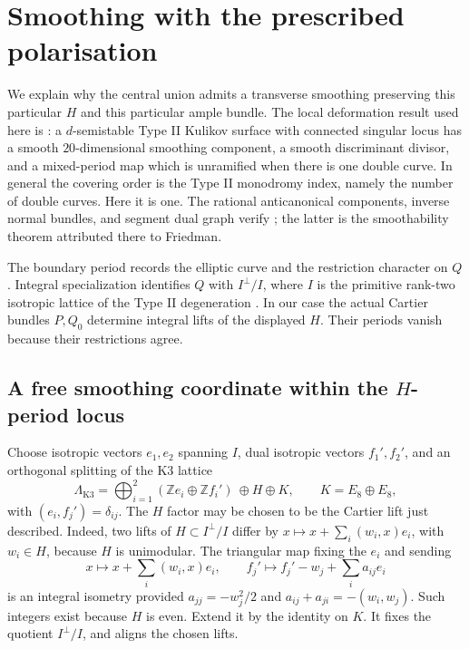 \documentclass[11pt]{article}
\theoremstyle{definition}
\theoremstyle{remark}
\newcommand{\Z}{\mathbb Z}
\begin{document}
\section{Smoothing with the prescribed polarisation}\label{sec:smoothing}

We explain why the central union admits a transverse smoothing preserving this particular $H$ and this particular ample bundle. The local deformation result used here is \cite[\S7A, Theorem~7.1]{AE}: a $d$-semistable Type II Kulikov surface with connected singular locus has a smooth $20$-dimensional smoothing component, a smooth discriminant divisor, and a mixed-period map which is unramified when there is one double curve. In general the covering order is the Type II monodromy index, namely the number of double curves. Here it is one. The rational anticanonical components, inverse normal bundles, and segment dual graph verify \cite[Definition~3.4 and Theorem~3.5]{AE}; the latter is the smoothability theorem attributed there to Friedman.

The boundary period records the elliptic curve and the restriction character on $Q$. Integral specialization identifies $Q$ with $I^\perp/I$, where $I$ is the primitive rank-two isotropic lattice of the Type II degeneration \cite[Proposition~3.20 and \S4]{AE}. In our case the actual Cartier bundles $P,Q_0$ determine integral lifts of the displayed $H$. Their periods vanish because their restrictions agree.

\subsection{A free smoothing coordinate within the \texorpdfstring{$H$}{H}-period locus}
Choose isotropic vectors $e_1,e_2$ spanning $I$, dual isotropic vectors $f_1',f_2'$, and an orthogonal splitting of the K3 lattice
\[
\Lambda_{\mathrm{K3}}=\bigoplus_{i=1}^2(\Z e_i\oplus\Z f_i')\ \oplus H\oplus K,
\qquad K=E_8\oplus E_8,
\]
with $(e_i,f_j')=\delta_{ij}$. The $H$ factor may be chosen to be the Cartier lift just described. Indeed, two lifts of $H\subset I^\perp/I$ differ by
$x\mapsto x+\sum_i(w_i,x)e_i$, with $w_i\in H$, because $H$ is unimodular. The triangular map fixing the $e_i$ and sending
\[
x\longmapsto x+\sum_i(w_i,x)e_i,\qquad
f_j'\longmapsto f_j'-w_j+\sum_i a_{ij}e_i
\]
is an integral isometry provided
$a_{jj}=-w_j^2/2$ and $a_{ij}+a_{ji}=-(w_i,w_j)$. Such integers exist because $H$ is even. Extend it by the identity on $K$. It fixes the quotient $I^\perp/I$, and aligns the chosen lifts.
\end{document}
